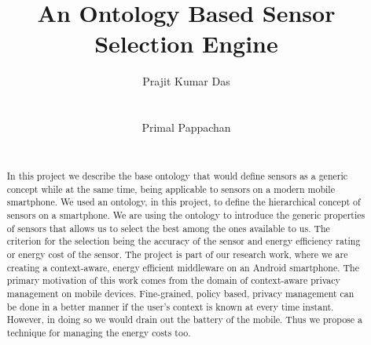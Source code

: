 \documentclass{ubicomp2013}
\begin{document}
\setlength{\projectheight}{11in}
\setlength{\projectwidth}{8.5in}
\setlength{\pdfpageheight}{\projectheight}
\setlength{\pdfpagewidth}{\projectwidth}


\title{An Ontology Based Sensor Selection Engine}
\author{
  \alignauthor Prajit Kumar Das\\
    \\
      \\
   \alignauthor Primal Pappachan\\
    \\
     }
\maketitle

\begin{abstract}

In this project we describe the base ontology that would define sensors as a generic concept while at the same time, being applicable to sensors on a modern mobile smartphone. We used an ontology, in this project, to define the hierarchical concept of sensors on a smartphone. We are using the ontology to introduce the generic properties of sensors that allows us to select the best among the ones available to us. The criterion for the selection being the accuracy of the sensor and energy efficiency rating or energy cost of the sensor. The project is part of our research work, where we are creating a context-aware, energy efficient middleware on an Android smartphone. The primary motivation of this work comes from the domain of context-aware privacy management on mobile devices. Fine-grained, policy based, privacy management can be done in a better manner if the user's context is known at every time instant. However, in doing so we would drain out the battery of the mobile. Thus we propose a technique for managing the energy costs too. 

\end{abstract}

\end{document}
